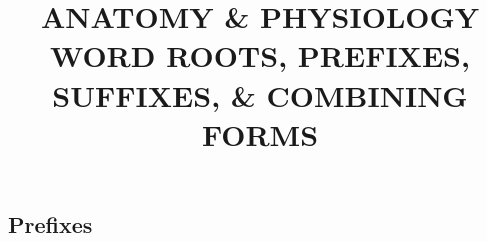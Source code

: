 \documentclass[10pt]{article}
\begin{document}
 \title{\uppercase{Anatomy \& Physiology \\ Word Roots, Prefixes, Suffixes, \& Combining Forms}}
 \date{\vspace{-10ex}}

 \maketitle
%


 \begin{multicols}{2}

 \section*{Prefixes}
 \sectionspace


\end{multicols}
\end{document}
